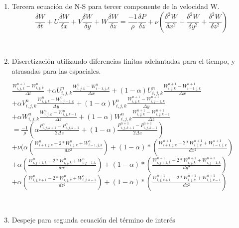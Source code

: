 \documentclass[a4paper]{article}
\begin{document}
\begin{enumerate}

\item Tercera ecuación de N-S para tercer componente de la velocidad W.
$$ \frac{\delta W}{\delta t} + U \frac{\delta W}{\delta x} + V \frac{\delta W}{\delta y} + W \frac{\delta W}{\delta z} =  \frac{-1}{\rho} \frac{\delta P}{\delta z} + \nu (\frac{{\delta}^{2} W}{\delta {x}^{2}} + \frac{{\delta}^{2} W}{\delta {y}^{2}} + \frac{{\delta}^{2} W}{\delta {z}^{2}}) $$

~\\

\item Discretización utilizando diferencias finitas adelantadas para el tiempo, y atrasadas para las espaciales.

$ \frac{ {W}^{n+1}_{i,j,k} - W^{n}_{i,j,k}}{ \Delta t} $
$+ \alpha {U}^{n}_{i,j,k} \frac{ {W}^{n}_{i,j,k} - W^{n}_{i-1,j,k}}{\Delta x} + (1 - \alpha) {U}^{n}_{i,j,k} \frac{ {W}^{n+1}_{i,j,k} - W^{n+1}_{i-1,j,k}}{ \Delta x}$ 
\\
$+ \alpha {V}^{n}_{i,j,k} \frac{ {W}^{n}_{i,j,k} - W^{n}_{i,j-1,k}}{ \Delta y} + (1 - \alpha) {V}^{n}_{i,j,k} \frac{ {W}^{n+1}_{i,j,k} - W^{n+1}_{i,j-1,k}}{ \Delta y}$
\\
$+ \alpha {W}^{n}_{i,j,k} \frac{ {W}^{n}_{i,j,k} - W^{n}_{i,j,k-1}}{ \Delta z} + (1 - \alpha) {W}^{n}_{i,j,k} \frac{ {W}^{n+1}_{i,j,k} - W^{n+1}_{i,j,k-1}}{ \Delta z}$
\\
$= \frac{-1}{\rho} ( \alpha \frac{P^{n}_{i,j,k+1} - P^{n}_{i,j,k-1} }{ 2 \Delta z } + (1 - \alpha) \frac{P^{n+1}_{i,j,k+1} - P^{n+1}_{i,j,k-1} }{ 2 \Delta z })  $
\\
$+ \nu (\alpha (\frac{ W^{n}_{i+1,j,k} - 2*W^{n}_{i,j,k} + W^{n}_{i-1,j,k}}{dx^2}) + (1-\alpha)*(\frac{ W^{n+1}_{i+1,j,k} - 2*W^{n+1}_{i,j,k} + W^{n+1}_{i-1,j,k}}{dx^2})$
\\
$+ \alpha (\frac{ W^{n}_{i,j+1,k} - 2*W^{n}_{i,j,k} + W^{n}_{i,j-1,k}}{dy^2}) + (1-\alpha)*(\frac{ W^{n+1}_{i,j+1,k} - 2*W^{n+1}_{i,j,k} + W^{n+1}_{i,j-1,k}}{dy^2})$
\\
$ + \alpha (\frac{ W^{n}_{i,j,k+1} - 2*W^{n}_{i,j,k} + W^{n}_{i,j,k-1}}{dz^2}) + (1-\alpha)*(\frac{ W^{n+1}_{i,j,k+1} - 2*W^{n+1}_{i,j,k} + W^{n+1}_{i,j,k-1}}{dz^2}) $

~\\

\item Despeje para segunda ecuación del término de interés


\end{enumerate}
\end{document}
